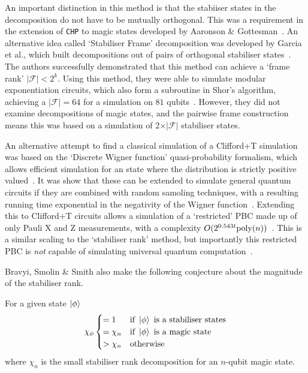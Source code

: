 \documentclass{standalone}
\begin{document}
An important distinction in this method is that the stabiiser states in the decomposition do not have to be mutually orthogonal. This was a requirement in the extension of \texttt{CHP} to magic states developed by Aaronson \& Gottesman~\cite{Aaronson2004a,Garcia2012}. An alternative idea called `Stabiliser Frame' decomposition was developed by Garcia et al., which built decompositions out of pairs of orthogonal stabiliser states~\cite{Garcia2012,Garcia2015}. The authors successfully demonstrated that this method can achieve a `frame rank' $\vert\mathcal{F}\vert < 2^{k}$. Using this method, they were able to simulate modular exponentiation circuits, which also form a subroutine in Shor's algorithm, achieving a $\vert\mathcal{F}\vert=64$ for a simulation on $81$ qubits~\cite{Garcia2015}. However, they did not examine decompositions of magic states, and the pairwise frame construction means this was based on a simulation of $2\times\vert\mathcal{F}\vert$ stabiliser states.
\par
An alternative attempt to find a classical simulation of a Clifford+T simulation was based on the `Discrete Wigner function' quasi-probability formalism, which allows efficient simulation for an state where the distribution is strictly positive valued~\cite{Veitch2012,Howard2014}. It was show that these can be extended to simulate general quantum circuits if they are combined with random samoling techniques, with a resulting running time exponential in the negativity of the Wigner function~\cite{Bravyi2015,Pashayan2015}. Extending this to Clifford+T circuits allows a simulation of a `restricted' PBC made up of only Pauli X and Z measurements, with a complexity $O(2^{0.543 t}\text{poly}(n))$~\cite{Bravyi2015,Delfosse2015}. This is a similar scaling to the `stabiliser rank' method, but importantly this restricted PBC is \emph{not} capable of simulating universal quantum computation~\cite{Bravyi2015}.
\par
Bravyi, Smolin \& Smith also make the following conjecture about the magnitude of the stabiliser rank.
\par
\begin{conj}\label{thm:magicrank}
    For a given state $\ket{\phi}$
    \[\chi_{\phi} 
        \begin{cases}
            = 1 & \text{if } \ket{\phi} \text{ is a stabiliser states} \\
            = \chi_{n} & \text{if } \ket{\phi} \text{ is a magic state} \\
            > \chi_{n} & \text{otherwise} \\
        \end{cases}
    \]
    where $\chi_{n}$ is the small stabiliser rank decomposition for an $n$-qubit magic state.
\end{conj}
\end{document}
